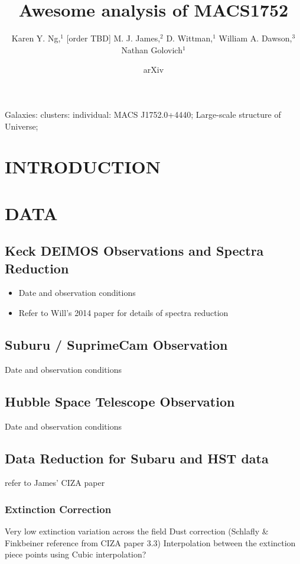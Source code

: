 \documentclass[letterpaper,useAMS,usenatbib]{mn2e}
\title[
	Awesome analysis of MACS1752 
]
{Awesome analysis of MACS1752}
\author[Karen Y. Ng et al.]{Karen Y. Ng,$^{1}$
	[order TBD]
	M. J. James,$^{2}$
	D. Wittman,$^{1}$
	William A. Dawson,$^{3}$ 
	\newauthor Nathan Golovich$^{1}$
}
\begin{document}
\date{arXiv} \pagerange{\pageref{firstpage}--\pageref{lastpage}}
 \maketitle\label{firstpage}
\begin{abstract} 
	
\end{abstract}
\begin{keywords}
Galaxies: clusters: individual: MACS J1752.0+4440; Large-scale structure of
Universe;
\end{keywords}
\section{INTRODUCTION} 
\section{DATA}
\subsection{Keck DEIMOS Observations and Spectra Reduction}
\begin{itemize}
	\item Date and observation conditions
	\item Refer to Will's 2014 paper for details of spectra reduction 
\end{itemize}

\subsection{Suburu / SuprimeCam Observation}
Date and observation conditions

\subsection{Hubble Space Telescope Observation} 
Date and observation conditions

\subsection{Data Reduction for Subaru and HST data}
refer to James' CIZA paper

\subsubsection{Extinction Correction}
Very low extinction variation across the field 
Dust correction (Schlafly \& Finkbeiner reference from CIZA paper 3.3) 
Interpolation between the extinction piece points using Cubic interpolation?
\end{document}
